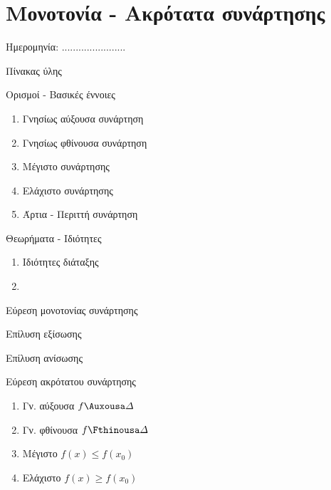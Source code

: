 \documentclass[twoside,nofonts,internet,math,spyros]{frontisthrio}
\newcommand{\myitem}{\stepcounter{enumi}\item[\raisebox{0.5mm}{\faExclamationTriangle}\ \Large$\square$]}
\begin{document}
\section{Μονοτονία - Ακρότατα συνάρτησης}
\begin{flushright}
\faCalendar* Ημερομηνία: .......................
\end{flushright}
\begin{mybox}[mysubtitle]{Πίνακας ύλης}
\begin{tcbraster}[raster columns=2,raster equal height]
\begin{myleftbox}{Ορισμοί - Βασικές έννοιες\ \ \faBook}
\begin{enumerate}[itemsep=0mm]
\item Γνησίως αύξουσα συνάρτηση
\item Γνησίως φθίνουσα συνάρτηση
\item Μέγιστο συνάρτησης
\item Ελάχιστο συνάρτησης
\item Άρτια - Περιττή συνάρτηση
\end{enumerate}
\end{myleftbox}
\begin{myrightbox}{Θεωρήματα - Ιδιότητες\ \ \faTools}
\begin{enumerate}[itemsep=0mm]
\item Ιδιότητες διάταξης
\item 
\end{enumerate}
\end{myrightbox}
\end{tcbraster}
\begin{multicols}{2}
\begin{todolist}[itemsep=0mm]
\myitem Εύρεση μονοτονίας συνάρτησης
\item Επίλυση εξίσωσης
\item Επίλυση ανίσωσης
\item Εύρεση ακρότατου συνάρτησης
\item 
\end{todolist}
\end{multicols}
\begin{multicols}{2}
\begin{enumerate}[itemsep=0mm]
\item Γν. αύξουσα $ f\Auxousa\varDelta $
\item Γν. φθίνουσα $ f\Fthinousa\varDelta $
\item Μέγιστο $ f(x)\leq f(x_0) $
\item Ελάχιστο $ f(x)\geq f(x_0) $
\end{enumerate}
\end{multicols}
\end{mybox}
\newpage
\end{document}
